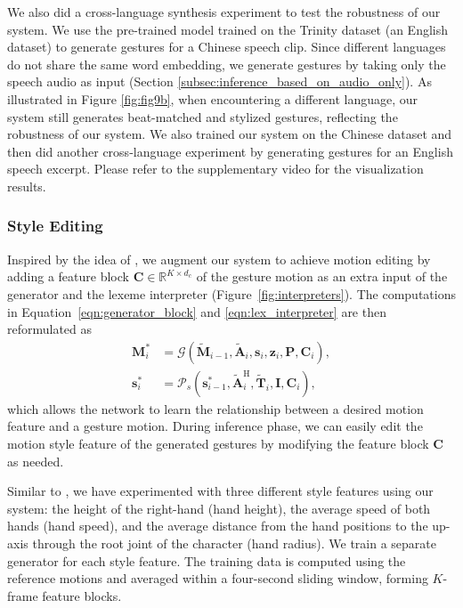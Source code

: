 \documentclass[acmtog,authorversion]{acmart}
\newcommand{\vect}[1]{\bm{#1}}
\newcommand{\tildevect}[1]{\vect{\tilde{#1}}}
\newcommand{\eqword}[1]{{\text{#1}}}
\newcommand{\fig}{Figure{}~}
\newcommand{\eqn}{Equation{}~}
\begin{document}
We also did a cross-language synthesis experiment to test the robustness of our system. We use the pre-trained model trained on the Trinity dataset (an English dataset) to generate gestures for a Chinese speech clip. Since different languages do not share the same word embedding, we generate gestures by taking only the speech audio as input (Section \ref{subsec:inference_based_on_audio_only}). As illustrated in Figure \ref{fig:fig9b}, when encountering a different language, our system still generates beat-matched and stylized gestures, reflecting the robustness of our system. We also trained our system on the Chinese dataset and then did another cross-language experiment by generating gestures for an English speech excerpt. Please refer to the supplementary video for the visualization results.

\subsubsection{Style Editing}
\label{subsubsec:style_editing}
Inspired by the idea of \citet{alexanderson2020style}, we augment our system to achieve motion editing by adding a feature block $\vect{C} \in\mathbb{R}^{K\times{}d_{c}}$ of the gesture motion as an extra input of the generator and the lexeme interpreter (\fig\ref{fig:interpreters}). The computations in \eqn\eqref{eqn:generator_block} and \eqref{eqn:lex_interpreter} are then reformulated as
\begin{align}
    \vect{M}_{i}^* &=\mathcal{G}(\tildevect{M}_{i-1},\tildevect{A}_{i},\vect{s}_i,\vect{z}_i,\vect{P},\vect{C}_i), \\
    \vect{s}_i^* &=\mathcal{P}_s(\vect{s}_{i-1}^*, \tildevect{A}_i^{\eqword{H}}, \tildevect{T}_i, \vect{I},\vect{C}_i), 
\end{align}
which allows the network to learn the relationship between a desired motion feature and a gesture motion. During inference phase, we can easily edit the motion style feature of the generated gestures by modifying the feature block $\vect{C}$ as needed.

Similar to \cite{alexanderson2020style}, we have experimented with three different style features using our system: the height of the right-hand (hand height), the average speed of both hands (hand speed), and the average distance from the hand positions to the up-axis through the root joint of the character (hand radius). We train a separate generator for each style feature. The training data is computed using the reference motions and averaged within a four-second sliding window, forming $K$-frame feature blocks. 
\end{document}
